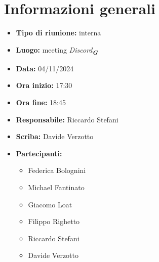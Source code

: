 


\section{Informazioni generali}

\begin{itemize}
    \item \textbf{Tipo di riunione:} interna
    \item \textbf{Luogo:} meeting \emph{Discord}\textsubscript{\textit{\textbf{G}}}
    \item \textbf{Data:} 04/11/2024
    \item \textbf{Ora inizio:} 17:30
    \item \textbf{Ora fine:} 18:45
    \item \textbf{Responsabile:} Riccardo Stefani
    \item \textbf{Scriba:} Davide Verzotto
    \item \textbf{Partecipanti:}
    \begin{itemize}
        \item Federica Bolognini
        \item Michael Fantinato
        \item Giacomo Loat
        \item Filippo Righetto
        \item Riccardo Stefani
        \item Davide Verzotto
    \end{itemize}
\end{itemize}
